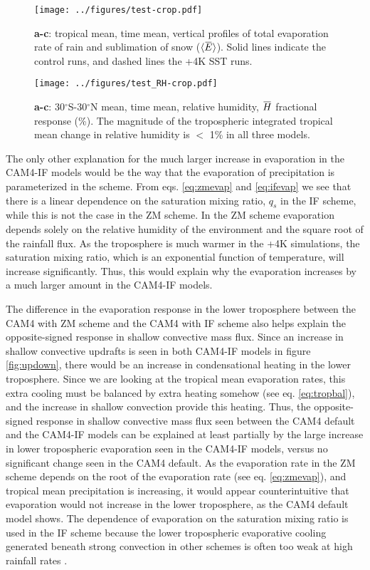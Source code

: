 \documentclass[letterpaper,12pt,titlepage,oneside,final]{book}
\newcommand{\overbar}[1]{\mkern 1.5mu\overline{\mkern-1.5mu#1\mkern-1.5mu}\mkern 1.5mu}
\begin{document}
\begin{figure}[H]
\centering
\noindent\texttt{[image: ../figures/test-crop.pdf]}\hfill
\caption{\footnotesize \footnotesize \textbf{a-c}: tropical mean, time mean, vertical profiles of total evaporation rate of rain and sublimation of snow ($\langle{\overbar{E}}\rangle$). Solid lines indicate the control runs, and dashed lines the +4K SST runs.}
\label{fig:evap}
\end{figure}
\begin{figure}[H]
\centering
\noindent\texttt{[image: ../figures/test\_RH-crop.pdf]}\hfill
\caption{\footnotesize \footnotesize \textbf{a-c}: 30$^{\circ}$S-30$^{\circ}$N mean, time mean, relative humidity, $\overbar{H}$ fractional response (\%). The magnitude of the tropospheric integrated tropical mean change in relative humidity is $<$ 1\% in all three models. }
\label{fig:RH}
\end{figure}
\newpage
The only other explanation for the much larger increase in evaporation in the CAM4-IF models would be the way that the evaporation of precipitation is parameterized in the scheme. From eqs. \ref{eq:zmevap} and \ref{eq:ifevap} we see that there is a linear dependence on the saturation mixing ratio, $q_{s}$ in the IF scheme, while this is not the case in the ZM scheme. In the ZM scheme evaporation depends solely on the relative humidity of the environment and the square root of the rainfall flux. As the troposphere is much warmer in the +4K simulations, the saturation mixing ratio, which is an exponential function of temperature, will increase significantly. Thus, this would explain why the evaporation increases by a much larger amount in the CAM4-IF models.

The difference in the evaporation response in the lower troposphere between the CAM4 with ZM scheme and the CAM4 with IF scheme also helps explain the opposite-signed response in shallow convective mass flux. Since an increase in shallow convective updrafts is seen in both CAM4-IF models in figure \ref{fig:updown}, there would be an increase in condensational heating in the lower troposphere. Since we are looking at the tropical mean evaporation rates, this extra cooling must be balanced by extra heating somehow (see eq. \ref{eq:tropbal}), and the increase in shallow convection provide this heating. Thus, the opposite-signed response in shallow convective mass flux seen between the CAM4 default and the CAM4-IF models can be explained at least partially by the large increase in lower tropospheric evaporation seen in the CAM4-IF models, versus no significant change seen in the CAM4 default. As the evaporation rate in the ZM scheme depends on the root of the evaporation rate (see eq. \ref{eq:zmevap}), and tropical mean precipitation is increasing, it would appear counterintuitive that evaporation would not increase in the lower troposphere, as the CAM4 default model shows. The dependence of evaporation on the saturation mixing ratio is used in the IF scheme because the lower tropospheric evaporative cooling generated beneath strong convection in other schemes is often too weak at high rainfall rates \citep{mitovski_temperature_2010}.
\end{document}
